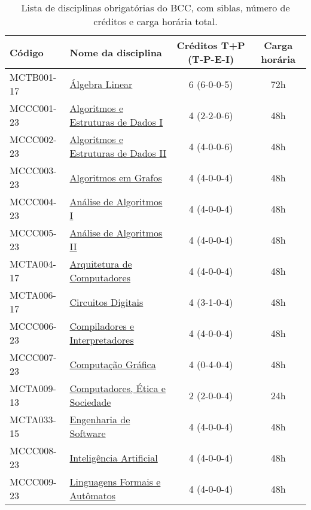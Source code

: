 \begin{table}[h!]
    \caption{Lista de disciplinas obrigatórias do BCC, com siblas, número de créditos e carga horária total.}
    \label{tab:disciplinas_obrigatorias_bcc}

    \centering
    \begin{tabular}{|l|p{}|c|c|}
        \hline
        \textbf{Código} & \textbf{Nome da disciplina} & \textbf{Créditos T+P (T-P-E-I)} & \textbf{Carga horária}\\
        \hline\hline
        MCTB001-17 & \hyperref[disc:alge_lin]{Álgebra Linear} & 6 (6-0-0-5) & 72h \\
        \hline
        MCCC001-23 & \hyperref[disc:aedI]{Algoritmos e Estruturas de Dados I} & 4 (2-2-0-6) & 48h \\
        \hline
        MCCC002-23 & \hyperref[disc:aedII]{Algoritmos e Estruturas de Dados II} & 4 (4-0-0-6) & 48h \\
        \hline
        MCCC003-23 & \hyperref[disc:ag]{Algoritmos em Grafos} & 4 (4-0-0-4) & 48h\\
        \hline
        MCCC004-23 & \hyperref[disc:aaI]{Análise de Algoritmos I} & 4 (4-0-0-4) & 48h \\
        \hline
        MCCC005-23 & \hyperref[disc:aaII]{Análise de Algoritmos II} & 4 (4-0-0-4) & 48h \\
        \hline
        MCTA004-17 & \hyperref[disc:arq]{Arquitetura de Computadores} & 4 (4-0-0-4) & 48h \\
        \hline
        MCTA006-17 & \hyperref[disc:circ_dig]{Circuitos Digitais} & 4 (3-1-0-4) & 48h \\
        \hline
        MCCC006-23 & \hyperref[disc:compi]{Compiladores e Interpretadores} & 4 (4-0-0-4) & 48h \\
        \hline
        MCCC007-23 & \hyperref[disc:cg]{Computação Gráfica} & 4 (0-4-0-4) & 48h  \\
        \hline
        MCTA009-13 & \hyperref[disc:ces]{Computadores, Ética e Sociedade} & 2 (2-0-0-4) & 24h \\
        \hline
        MCTA033-15 & \hyperref[disc:es]{Engenharia de Software} & 4 (4-0-0-4) & 48h \\
        \hline
        MCCC008-23 & \hyperref[disc:ia]{Inteligência Artificial} & 4 (4-0-0-4) & 48h \\
        \hline
        MCCC009-23 & \hyperref[disc:lfa]{Linguagens Formais e Autômatos} & 4 (4-0-0-4) & 48h \\
        \hline

\end{tabular}
\end{table}
